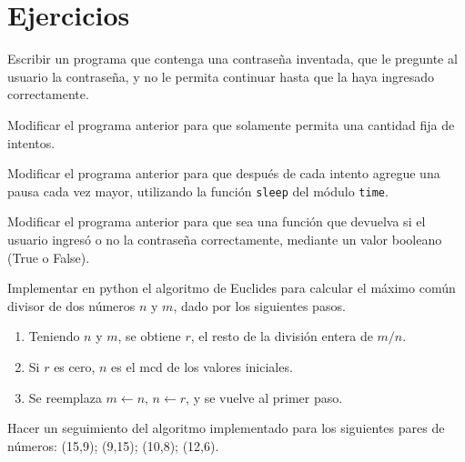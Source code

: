 \newpage
\section{Ejercicios}



\begin{partes}
    \item Escribir un programa que contenga una contraseña inventada, que le
pregunte al usuario la contraseña, y no le permita continuar hasta que la
haya ingresado correctamente.
    \item Modificar el programa anterior para que solamente permita una
cantidad fija de intentos.
    \item Modificar el programa anterior para que después de cada intento
agregue una pausa cada vez mayor, utilizando la función \verb!sleep! del
módulo \verb!time!.
    \item Modificar el programa anterior para que sea una función que devuelva
si el usuario ingresó o no la contraseña correctamente, mediante un valor
booleano (True o False).
\end{partes}




\begin{partes}
    \item Implementar en python el algoritmo de Euclides para calcular el máximo
común divisor de dos números $n$ y $m$, dado por los siguientes pasos.
    \begin{enumerate}
        \item Teniendo $n$ y $m$, se obtiene $r$, el resto de la
división entera de $m/n$.
        \item Si $r$ es cero, $n$ es el mcd de los valores iniciales.
        \item Se reemplaza $m \leftarrow n$, $n \leftarrow r$, y se vuelve al
primer paso.
    \end{enumerate}
    \item Hacer un seguimiento del algoritmo implementado para los siguientes
pares de números: (15,9); (9,15); (10,8); (12,6).
\end{partes}

